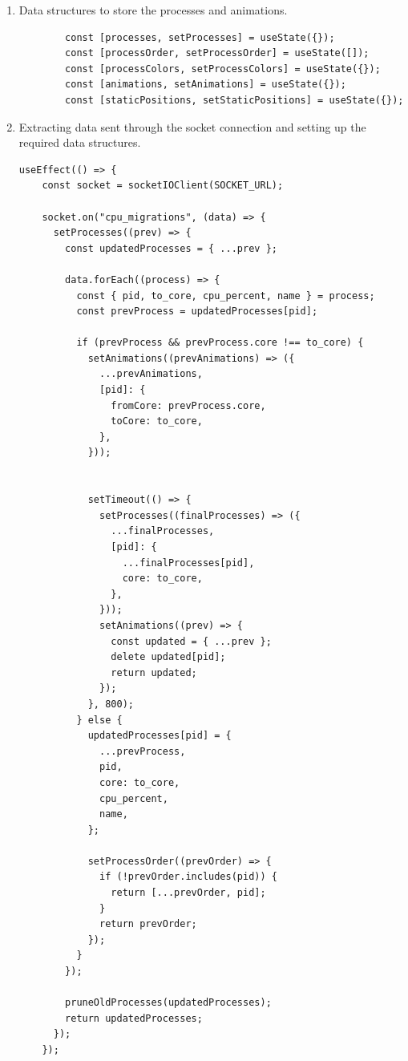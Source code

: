 \documentclass[12pt]{article}
\begin{document}
\begin{enumerate}
    \item Data structures to store the processes and animations.
    \begin{verbatim}
        const [processes, setProcesses] = useState({});
        const [processOrder, setProcessOrder] = useState([]); 
        const [processColors, setProcessColors] = useState({});
        const [animations, setAnimations] = useState({});
        const [staticPositions, setStaticPositions] = useState({});
    \end{verbatim}
    \item Extracting data sent through the socket connection and setting up the required data structures. 
\begin{verbatim}
useEffect(() => {
    const socket = socketIOClient(SOCKET_URL);

    socket.on("cpu_migrations", (data) => {
      setProcesses((prev) => {
        const updatedProcesses = { ...prev };

        data.forEach((process) => {
          const { pid, to_core, cpu_percent, name } = process;
          const prevProcess = updatedProcesses[pid];

          if (prevProcess && prevProcess.core !== to_core) {
            setAnimations((prevAnimations) => ({
              ...prevAnimations,
              [pid]: {
                fromCore: prevProcess.core,
                toCore: to_core,
              },
            }));

            
            setTimeout(() => {
              setProcesses((finalProcesses) => ({
                ...finalProcesses,
                [pid]: {
                  ...finalProcesses[pid],
                  core: to_core,
                },
              }));
              setAnimations((prev) => {
                const updated = { ...prev };
                delete updated[pid];
                return updated;
              });
            }, 800); 
          } else {
            updatedProcesses[pid] = {
              ...prevProcess,
              pid,
              core: to_core,
              cpu_percent,
              name,
            };

            setProcessOrder((prevOrder) => {
              if (!prevOrder.includes(pid)) {
                return [...prevOrder, pid];
              }
              return prevOrder;
            });
          }
        });

        pruneOldProcesses(updatedProcesses);
        return updatedProcesses;
      });
    });


\end{verbatim}
\end{enumerate}
\end{document}
